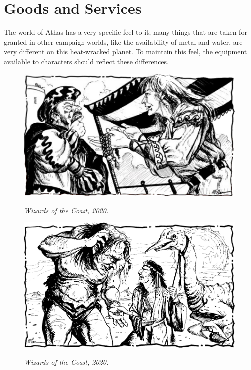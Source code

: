 \section{Goods and Services}
The world of Athas has a very specific feel to it; many things that are taken for granted in other campaign worlds, like the availability of metal and water, are very different on this heat-wracked planet. To maintain this feel, the equipment available to characters should reflect these differences.

\begin{figure}[t!]
\centering
\includegraphics[width=\textwidth]{images/merchant-1.png}
\par\textit{\small\textcopyright Wizards of the Coast, 2020.}
\end{figure}







\begin{figure}[b!]
\centering
\includegraphics[width=\textwidth]{images/merchant-3.png}
\par\textit{\small\textcopyright Wizards of the Coast, 2020.}
\end{figure}




